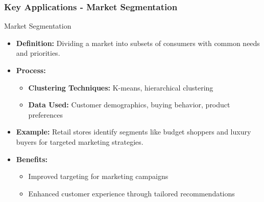 \documentclass{beamer}
\begin{document}
\begin{frame}[fragile]
    \frametitle{Key Applications - Market Segmentation}
    \begin{block}{Market Segmentation}
        \begin{itemize}
            \item \textbf{Definition:} Dividing a market into subsets of consumers with common needs and priorities.
            \item \textbf{Process:}
            \begin{itemize}
                \item \textbf{Clustering Techniques:} K-means, hierarchical clustering
                \item \textbf{Data Used:} Customer demographics, buying behavior, product preferences
            \end{itemize}
            \item \textbf{Example:} Retail stores identify segments like budget shoppers and luxury buyers for targeted marketing strategies.
            \item \textbf{Benefits:}
            \begin{itemize}
                \item Improved targeting for marketing campaigns
                \item Enhanced customer experience through tailored recommendations
            \end{itemize}
        \end{itemize}
    \end{block}
\end{frame}
\end{document}
